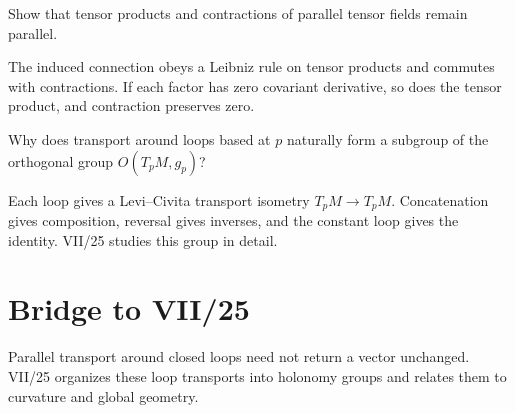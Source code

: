 \begin{problem}\label{prob:vii24-ch04}
Show that tensor products and contractions of parallel tensor fields remain parallel.
\end{problem}
\begin{solution}
The induced connection obeys a Leibniz rule on tensor products and commutes with contractions. If each factor has zero covariant derivative, so does the tensor product, and contraction preserves zero.
\end{solution}


\begin{problem}\label{prob:vii24-ch05}
Why does transport around loops based at \(p\) naturally form a subgroup of the orthogonal group \(O(T_pM,g_p)\)?
\end{problem}
\begin{solution}
Each loop gives a Levi--Civita transport isometry \(T_pM\to T_pM\). Concatenation gives composition, reversal gives inverses, and the constant loop gives the identity. VII/25 studies this group in detail.
\end{solution}

\section*{Bridge to VII/25}
Parallel transport around closed loops need not return a vector unchanged. VII/25 organizes these loop transports into holonomy groups and relates them to curvature and global geometry.
